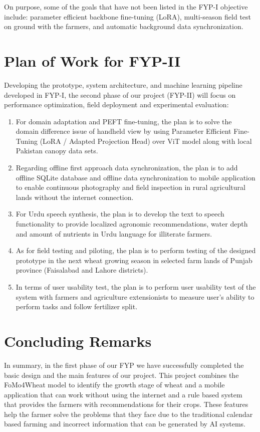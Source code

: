 \documentclass{FastFyp}
\begin{document}
On purpose, some of the goals that have not been listed in the FYP-I objective include: parameter efficient backbone fine-tuning (LoRA), multi-season field test on ground with the farmers, and automatic background data synchronization.


\section{Plan of Work for FYP-II}

Developing the prototype, system architecture, and machine learning pipeline developed in FYP-I, the second phase of our project (FYP-II) will focus on performance optimization, field deployment and experimental evaluation:
\begin{enumerate}
    \item For domain adaptation and PEFT fine-tuning, the plan is to solve the domain difference issue of handheld view by using Parameter Efficient Fine-Tuning (LoRA / Adapted Projection Head) over ViT model along with local Pakistan canopy data sets.

    \item Regarding offline first approach data synchronization, the plan is to add offline SQLite database and offline data synchronization to mobile application to enable continuous photography and field inspection in rural agricultural lands without the internet connection.

    \item For Urdu speech synthesis, the plan is to develop the text to speech functionality to provide localized agronomic recommendations, water depth and amount of nutrients in Urdu language for illiterate farmers.

    \item As for field testing and piloting, the plan is to perform testing of the designed prototype in the next wheat growing season in selected farm lands of Punjab province (Faisalabad and Lahore districts).

    \item In terms of user usability test, the plan is to perform user usability test of the system with farmers and agriculture extensionists to measure user's ability to perform tasks and follow fertilizer split.
\end{enumerate}

\section{Concluding Remarks}
In summary, in the first phase of our FYP we have successfully completed the basic design and the main features of our project. This project combines the FoMo4Wheat model to identify the growth stage of wheat and a mobile application that can work without using the internet and a rule based system that provides the farmers with recommendations for their crops. These features help the farmer solve the problems that they face due to the traditional calendar based farming and incorrect information that can be generated by AI systems. 
\end{document}
